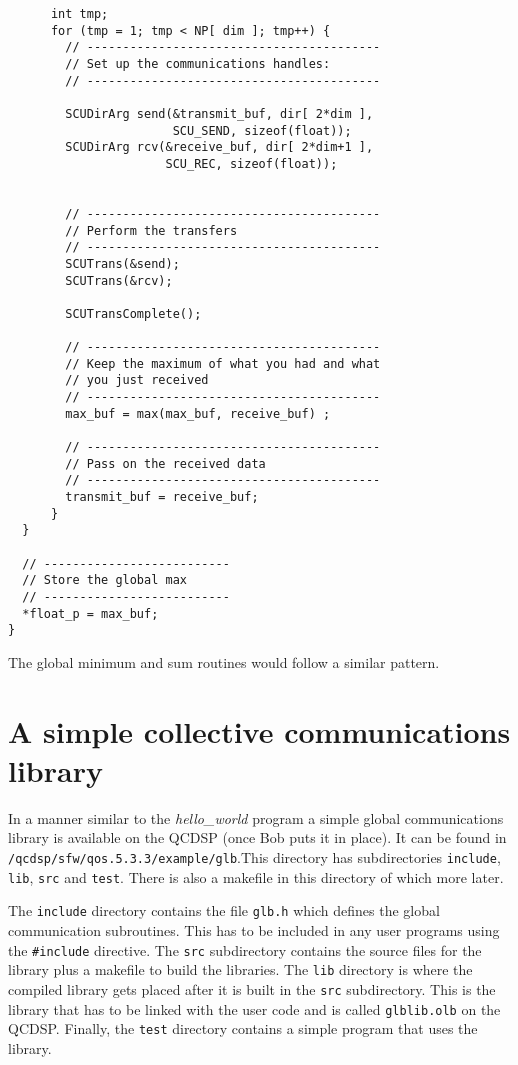 \begin{verbatim}
      int tmp;
      for (tmp = 1; tmp < NP[ dim ]; tmp++) {
        // -----------------------------------------
        // Set up the communications handles:
        // -----------------------------------------

        SCUDirArg send(&transmit_buf, dir[ 2*dim ],
                       SCU_SEND, sizeof(float));
        SCUDirArg rcv(&receive_buf, dir[ 2*dim+1 ],
                      SCU_REC, sizeof(float));


        // -----------------------------------------
        // Perform the transfers
        // -----------------------------------------
        SCUTrans(&send);
        SCUTrans(&rcv);

        SCUTransComplete();

        // -----------------------------------------
        // Keep the maximum of what you had and what
        // you just received
        // -----------------------------------------
        max_buf = max(max_buf, receive_buf) ;

        // -----------------------------------------
        // Pass on the received data
        // -----------------------------------------
        transmit_buf = receive_buf;
      }
  }

  // --------------------------
  // Store the global max
  // --------------------------
  *float_p = max_buf;
}
\end{verbatim}
The global minimum and sum routines would follow a similar pattern.

\section{A simple collective communications library}
In a manner similar to the {\em hello\_world} program a simple
global communications library is available on the QCDSP (once 
Bob puts it in place). It can be found in {\tt /qcdsp/sfw/qos.5.3.3/example/glb}.This directory has subdirectories {\tt include}, {\tt lib}, {\tt src} and {\tt test}. There is also a makefile in this directory of which more later.

The {\tt include} directory contains the file {\tt glb.h} which defines
the global communication subroutines. This has to be included in any 
user programs using the {\tt \#include} directive. The {\tt src} 
subdirectory contains the source files for the library plus a makefile
to build the libraries. The {\tt lib} directory is where the compiled
library gets placed after it is built in the {\tt src} subdirectory. 
This is the library that has to be linked with the user code and
is called {\tt glblib.olb} on the QCDSP. Finally, the {\tt test} 
directory contains a simple program that uses the library.

